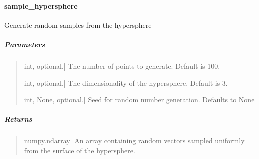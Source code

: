 \documentclass[letterpaper,10pt,english,openany,oneside]{sphinxmanual}
\begin{document}
{{{{\sphinxstepscope


\paragraph{sample\_hypersphere}
\label{\detokenize{api_reference/generated/QuadratiK.tools.sample_hypersphere:sample-hypersphere}}\label{\detokenize{api_reference/generated/QuadratiK.tools.sample_hypersphere::doc}}

\begin{fulllineitems}
\label{\detokenize{api_reference/generated/QuadratiK.tools.sample_hypersphere:QuadratiK.tools.sample_hypersphere}}
\pysigstartsignatures
{}
\pysigstopsignatures
\sphinxAtStartPar
Generate random samples from the hypersphere


\subparagraph{Parameters}
\label{\detokenize{api_reference/generated/QuadratiK.tools.sample_hypersphere:parameters}}\begin{quote}
\begin{description}
\sphinxlineitem{npoints}{[}int, optional.{]}
\sphinxAtStartPar
The number of points to generate.
Default is 100.

\sphinxlineitem{ndim}{[}int, optional.{]}
\sphinxAtStartPar
The dimensionality of the hypersphere.
Default is 3.

\sphinxlineitem{random\_state}{[}int, None, optional.{]}
\sphinxAtStartPar
Seed for random number generation. Defaults to None

\end{description}
\end{quote}


\subparagraph{Returns}
\label{\detokenize{api_reference/generated/QuadratiK.tools.sample_hypersphere:returns}}\begin{quote}
\begin{description}
\sphinxlineitem{data on sphere}{[}numpy.ndarray{]}
\sphinxAtStartPar
An array containing random vectors sampled uniformly
from the surface of the hypersphere.


\end{description}
\end{quote}
\end{fulllineitems}}}}}
\end{document}
